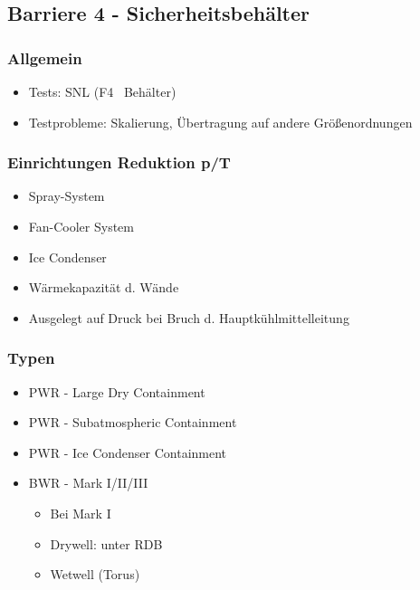 \documentclass[12pt]{article}
\begin{document}
\subsection{Barriere 4 - Sicherheitsbehälter}

\subsubsection{Allgemein}
\begin{itemize}
  \item Tests: SNL (F4 \textrightarrow\ Behälter)
  \item Testprobleme: Skalierung, Übertragung auf andere Größenordnungen
\end{itemize}

\subsubsection{Einrichtungen Reduktion p/T}
\begin{itemize}
  \item Spray-System
  \item Fan-Cooler System
  \item Ice Condenser
  \item Wärmekapazität d. Wände
  \item Ausgelegt auf Druck bei Bruch d. Hauptkühlmittelleitung
\end{itemize}

\subsubsection{Typen}
\begin{itemize}
  \item PWR - Large Dry Containment
  \item PWR - Subatmospheric Containment
  \item PWR - Ice Condenser Containment
  \item BWR - Mark I/II/III
  \begin{itemize}
    \item Bei Mark I
    \item Drywell: unter RDB
    \item Wetwell (Torus)
  \end{itemize}
\end{itemize}
\end{document}
